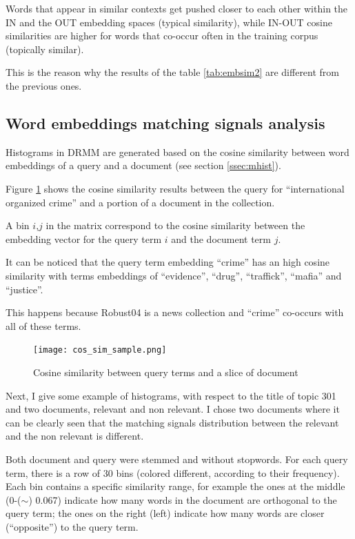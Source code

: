 Words that appear in similar contexts get pushed closer to each other
within the IN and the OUT embedding spaces (typical similarity), while
IN-OUT cosine similarities are higher for words that co-occur often in
the training corpus (topically similar).

This is the reason why the results of the table \ref{tab:embsim2} are different from the previous ones.

\subsection{Word embeddings matching signals analysis}

Histograms in DRMM are generated based on the cosine similarity between word embeddings of a query and a document (see section \ref{ssec:mhist}).

Figure \ref{fig:cos_sim_sample} shows the cosine similarity results between the query for ``international organized crime'' and a portion of a document in the collection.

A bin $i$,$j$ in the matrix correspond to the cosine similarity between the embedding vector for the query term $i$ and the document term $j$.

It can be noticed that the query term embedding ``crime'' has an high cosine similarity with terms embeddings of ``evidence'', ``drug'', ``traffick'', ``mafia'' and ``justice''.

This happens because Robust04 \cite{rob04} is a news collection and ``crime'' co-occurs with all of these terms.

\begin{figure}[H]
  \centering
  \texttt{[image: cos\_sim\_sample.png]}
  \caption{Cosine similarity between query terms and a slice of document}
  \label{fig:cos_sim_sample}
\end{figure}

Next, I give some example of histograms, with respect to the title of topic 301 and two documents, relevant and non relevant. I chose two documents where it can be clearly seen that the matching signals distribution between the relevant and the non relevant is different.

Both document and query were stemmed and without stopwords. For each query term, there is a row of 30 bins (colored different, according to their frequency). Each bin contains a specific similarity range, for
example the ones at the middle (0-($\sim$) 0.067) indicate how many words in the document are orthogonal to the query term; the ones on the right (left) indicate how many words are closer (``opposite'') to the query term.

